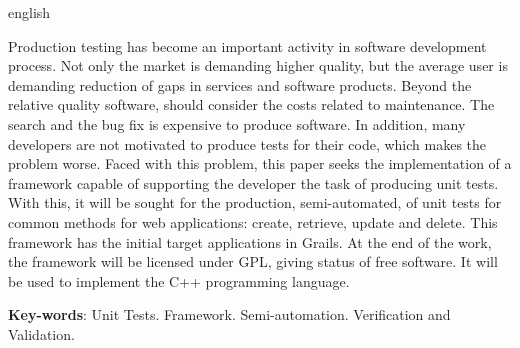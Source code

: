 \begin{resumo}[Abstract]
 \begin{otherlanguage*}{english}

\vspace{\onelineskip}
 Production testing has become an important activity in software development process. Not only the market is demanding higher quality, but the average user is demanding reduction of gaps in services and software products. Beyond the relative quality software, should consider the costs related to maintenance. The search and the bug fix is expensive to produce software. In addition, many developers are not motivated to produce tests for their code, which makes the problem worse. Faced with this problem, this paper seeks the implementation of a framework capable of supporting the developer the task of producing unit tests. With this, it will be sought for the production, semi-automated, of unit tests for common methods for web applications: create, retrieve, update and delete. This framework has the initial target applications in Grails. At the end of the work, the framework will be licensed under GPL, giving status of free software. It will be used to implement the C++ programming language.
   \noindent 
   
   \textbf{Key-words}: Unit Tests. Framework. Semi-automation. Verification and Validation.
 \end{otherlanguage*}
\end{resumo}
